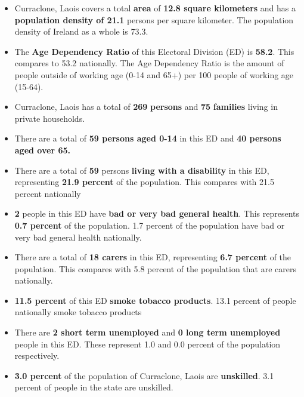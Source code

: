 \documentclass{article}
\begin{document}
\begin{itemize}

\item Curraclone, Laois covers a total \textbf{area} of  \textbf{12.8 square kilometers} and has a \textbf{population density of 21.1} persons per square kilometer. The population density of Ireland as a whole is  73.3. 

\item The \textbf{Age Dependency Ratio} of this Electoral Division (ED) is  \textbf{58.2}. This compares to 53.2 nationally. The Age Dependency Ratio is the amount of people outside of working age (0-14 and 65+) per 100 people of working age (15-64). 

\item Curraclone, Laois has a total of \textbf{269} \textbf{persons} and  \textbf{75} \textbf{families} living in private households.

\item There are a total of \textbf{59 persons aged 0-14} in this ED and \textbf{40 persons aged over 65.} 

\item There are a total of \textbf{59} persons \textbf{living with a disability} in this ED, representing \textbf{21.9 percent} of the population. This compares with  21.5 percent nationally

\item \textbf{2} people in this ED have \textbf{bad or very bad general health}. This represents \textbf{0.7 percent} of the population. 1.7 percent of the population have bad or very bad general health nationally. 

\item There are a total of \textbf{18 carers} in this ED, representing \textbf{6.7 percent} of the population. This compares with 5.8 percent of the population that are carers nationally. 

\item \textbf{11.5 percent} of this ED \textbf{smoke tobacco products}. 13.1 percent of people nationally smoke tobacco products

\item There are \textbf{2 short term unemployed} and \textbf{0 long term unemployed} people in this ED. These represent 1.0 and 0.0 percent of the population respectively.

\item  \textbf{3.0 percent} of the population of Curraclone, Laois are \textbf{unskilled}. 3.1 percent of people in the state are unskilled.


\end{itemize}
\end{document}
